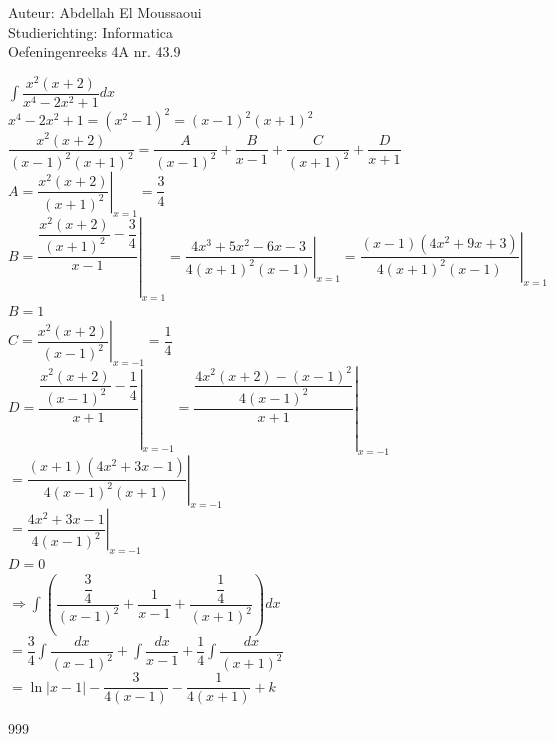 \documentclass[a4paper]{article}
\begin{document}
  
\noindent \large Auteur: Abdellah El Moussaoui \\
\noindent \large Studierichting: Informatica\\
\noindent \large Oefeningenreeks 4A nr. 43.9\\

\medskip

\normalsize

$\displaystyle\int \dfrac{x^2\left(x+2\right)}{x^4-2x^2+1}dx$\\

$x^4-2x^2+1=\left(x^2-1\right)^2=\left(x-1\right)^2\left(x+1\right)^2$\\

$\dfrac{x^2\left(x+2\right)}{\left(x-1\right)^2\left(x+1\right)^2} = \dfrac{A}{\left(x-1\right)^2} + \dfrac{B}{x-1} + \dfrac{C}{\left(x+1\right)^2} + \dfrac{D}{x+1}$\\

$A = \left.\dfrac{x^2\left(x+2\right)}{\left(x+1\right)^2}\right|_{x=1} = \dfrac{3}{4}$\\

$B = \left.\dfrac{\dfrac{x^2\left(x+2\right)}{\left(x+1\right)^2}-\dfrac{3}{4}}{x-1}\right|_{x=1} 
= \left.\dfrac{4x^3+5x^2-6x-3}{4\left(x+1\right)^2\left(x-1\right)}\right|_{x=1} 
= \left.\dfrac{\left(x-1\right)\left(4x^2+9x+3\right)}{4\left(x+1\right)^2\left(x-1\right)}\right|_{x=1}$\\

$B = 1$\\

$C = \left.\dfrac{x^2\left(x+2\right)}{\left(x-1\right)^2}\right|_{x=-1} = \dfrac{1}{4}$\\


$D = \left.\dfrac{\dfrac{x^2\left(x+2\right)}{\left(x-1\right)^2}-\dfrac{1}{4}}{x+1}\right|_{x=-1}
= \left.\dfrac{\dfrac{4x^2\left(x+2\right)-\left(x-1\right)^2}{4\left(x-1\right)^2}}{x+1}\right|_{x=-1}$\\

$= \left.\dfrac{\left(x+1\right)\left(4x^2+3x-1\right)}{4\left(x-1\right)^2\left(x+1\right)}\right|_{x=-1}$\\

$= \left.\dfrac{4x^2+3x-1}{4\left(x-1\right)^2}\right|_{x=-1}$\\

$D = 0$\\

$\Rightarrow \displaystyle\int \left(\dfrac{\dfrac{3}{4}}{\left(x-1\right)^2} + \dfrac{1}{x-1} + \dfrac{\dfrac{1}{4}}{\left(x+1\right)^2}\right)dx$\\

$= \dfrac{3}{4}\displaystyle\int\dfrac{dx}{\left(x-1\right)^2} + \displaystyle\int\dfrac{dx}{x-1} + \dfrac{1}{4}\displaystyle\int\dfrac{dx}{\left(x+1\right)^2}$\\

$= \ln{\left|x-1\right|} - \dfrac{3}{4\left(x-1\right)} - \dfrac{1}{4\left(x+1\right)}
+k$\\

\begin{thebibliography}{999}
\end{thebibliography}
\end{document}
